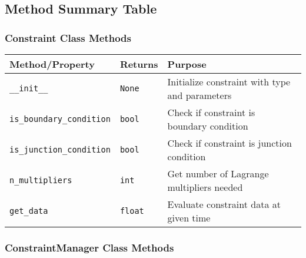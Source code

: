 \subsection{Method Summary Table}
\label{subsec:constraints_method_summary}

\subsubsection{Constraint Class Methods}

\begin{longtable}{|p{5cm}|p{2cm}|p{7cm}|}
\hline
\textbf{Method/Property} & \textbf{Returns} & \textbf{Purpose} \\
\hline
\endhead

\texttt{\_\_init\_\_} & \texttt{None} & Initialize constraint with type and parameters \\
\hline

\texttt{is\_boundary\_condition} & \texttt{bool} & Check if constraint is boundary condition \\
\hline

\texttt{is\_junction\_condition} & \texttt{bool} & Check if constraint is junction condition \\
\hline

\texttt{n\_multipliers} & \texttt{int} & Get number of Lagrange multipliers needed \\
\hline

\texttt{get\_data} & \texttt{float} & Evaluate constraint data at given time \\
\hline

\end{longtable}

\subsubsection{ConstraintManager Class Methods}

